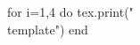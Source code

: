 \documentclass[twoside, 10pt]{article}
\title{}
\date{}
\newcommand{\template}{
\directlua{tex.print(utils.genVersion())}
\noindent
{\large
First Name \rule{6em}{.1pt}\hspace{\stretch{1}} Last Name \rule{6em}{.1pt}\hspace{\stretch{1}} Date \rule{1.5em}{.1pt} -- \rule{1.5em}{.1pt} -- \rule{1.5em}{.1pt}\hspace{\stretch{1}} Period \rule{2em}{.1pt}\hspace{\stretch{1}} Score \rule{2em}{.1pt}
}
\vspace{1em}
\begin{enumerate}
\item ({\textbf{Be Precise}}) Score: \rule{2em}{.4pt} 
\begin{enumerate}
\item Rewrite each expression as a single exponent.
\begin{enumerate}
\item
$x^{\directlua{tex.print(utils.genRandom(2,10, false, false, false))}}\cdot x^{\directlua{tex.print(utils.genRandom(2,10, false, false, false))}}$
\vspace{\stretch{1}}
\item
$(y^{\directlua{tex.print(utils.genRandom(2,10, false, false, false))}})^{\directlua{tex.print(utils.genRandom(2,10, false, false, false))}}$
\vspace{\stretch{1}}
\end{enumerate}
\item Rewrite the expression in exponential form: $\sqrt[\directlua{tex.print(utils.genRandom(2,10, false, false, false))}]{a^{\directlua{tex.print(utils.genRandom(2,10, false, false, false))}}}$.
\vspace{\stretch{1}}
\item Rewrite each expression as a single logarithm.
\begin{enumerate}
\item
$\log_b\left(\directlua{tex.print(utils.genRandom(2,10, false, false, false))}\right) + \log_b\left(\directlua{tex.print(utils.genRandom(2,10, false, false, false))}\right)$
\vspace{\stretch{1}}
\item $\log_b\left(\directlua{tex.print(utils.genRandom(2,10, false, false, false))}\right) - \log_b\left(\directlua{tex.print(utils.genRandom(2,10, false, false, false))}\right)$
\vspace{\stretch{1}}
\end{enumerate}
\item Rewrite each expression so that it does not show any exponent in the logarithm.
\begin{enumerate}
\item
$\log_b\left(c^{\directlua{tex.print(utils.genRandom(20,99, false, false, false))}}\right)$
\vspace{\stretch{1}}
\item $\ln(x^{\directlua{tex.print(utils.genRandom(2,20, false, false, false))}}y^{\directlua{tex.print(utils.genRandom(2,20, false, false, false))}})$
\vspace{\stretch{1}}
\end{enumerate}
\item \textbf{Choose one problem to solve:}
\begin{enumerate}
\item(\textbf{Rebuild}) Rewrite the expression as a single logarithm, then find its value.
\[
\directlua{b = utils.genRandom(2,5, false, false, false); e = utils.genRandom(-2,2, false, false, true); c = utils.genRandom(2,4, false, false, b); }
\log_{\directlua{tex.print(b)}}({\directlua{tex.print(c)}}) - \log_{\directlua{tex.print(b)}}\left({\directlua{tex.print(c ..  "\\times" .. utils.printFraction(b,e))}}\right)
\]
\vspace{\stretch{1}}

\rule{20em}{.4pt}\hspace{10em}\rule{10em}{.4pt}
\item(\textbf{Recap}) Suppose $\ln(a) = \directlua{tex.print(utils.genRandom(-5,5, false, false, true))}$. Rewrite the expression as a single logarithm, then find its value.
\[
\directlua{ d = utils.genRandom(-5,5, false, false, true); e = utils.genRandom(-5,5, false, false, true); }
\ln(a^{\directlua{tex.print(e)}}) + \ln(a^{\directlua{tex.print(d)}})
\]
\vspace{\stretch{1}}

\rule{20em}{.4pt}\hspace{10em}\rule{10em}{.4pt}
\end{enumerate}

\end{enumerate}
\clearpage
\item ({\textbf{Model}}) Score: \rule{2em}{.4pt} 

\textbf{Choose one problem to solve:}
\begin{enumerate}
\item(\textbf{Rebuild})
Population growth in the U.S. between 1800 and 1850, in millions, can be represented
by the function $f$, defined by $f(t) = 5 · e^{0.028t}$, where $t$ represents the number of years
after 1800.
\begin{enumerate}
\item
What does $f$ estimate for the U.S population in \directlua{tex.print(utils.genRandom(0,50, false, false, false) + 1800)}?  \textbf{Show your reasoning}.
\vspace{\stretch{1}}
\item According to the model, when does the population of  U.S. reach  \directlua{tex.print(utils.genRandom(6,20, false, false, false))} millions?  \textbf{Show your reasoning}.
\vspace{\stretch{1}}
\end{enumerate}
\item (\textbf{Recap})
A bank account had a balance of \$$100$. Because of the interest accumulated over time,
the balance doubles every decade. No withdrawals or other deposits are made.
\begin{enumerate}
\item 
Write an equation that shows when (at what value of $t$) the account will have
$x$ dollars.\\[1em]
\begin{center}
\rule{20em}{0.4pt}
\end{center}
\item
Find out when the account will have the following amounts. \textbf{Show your reasoning}.
\begin{enumerate}
\item
\$\directlua{tex.print(utils.genRandom(1, 10, false, false, false) * 1000) }
\vspace{\stretch{1}}
\item
\$\directlua{tex.print(utils.genRandom(11, 20, false, false, false) * 1000) }
\vspace{\stretch{1}}
\end{enumerate}
\end{enumerate}
\clearpage
\end{enumerate}
\end{enumerate}
}
\begin{document}
\begin{luacode}
for i=1,4 do
	tex.print("\\template")
end
\end{luacode}
\end{document}
